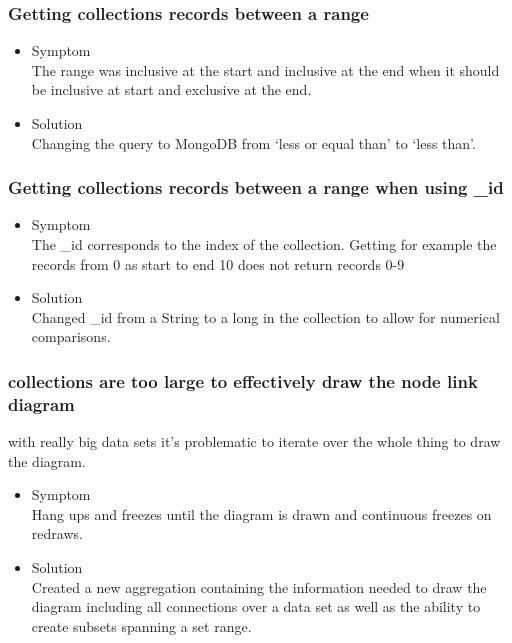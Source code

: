\documentclass[oneside, english, final]{design}
\begin{document}
\subsubsection{Getting collections records between a range}



\begin{itemize}
      \item{Symptom
            \\
            The range was inclusive at the start and inclusive at the end when it should be inclusive at start and exclusive at the end.
	}
      \item{Solution
            \\
            Changing the query to MongoDB from `less or equal than' to `less than'.
            }
\end{itemize}

\subsubsection{Getting collections records between a range when using \_id }

\begin{itemize}
      \item{Symptom
            \\
            The \_id corresponds to the index of the collection. Getting for example the records from 0 as start to end 10 does not return records 0-9
	}
      \item{Solution
            \\
            Changed \_id from a String to a long in the collection to allow for numerical comparisons.
            }
\end{itemize}



\subsubsection{collections are too large to effectively draw the node link diagram}

with really big data sets it's problematic to iterate over the whole thing to draw the diagram.

\begin{itemize}
      \item{Symptom
            \\
            Hang ups and freezes until the diagram is drawn and continuous freezes on redraws.
	}
      \item{Solution
            \\
            Created a new aggregation containing the information needed to draw the diagram including all connections over a data set as well as the ability to create subsets spanning a set range.
            }
\end{itemize}
\end{document}
